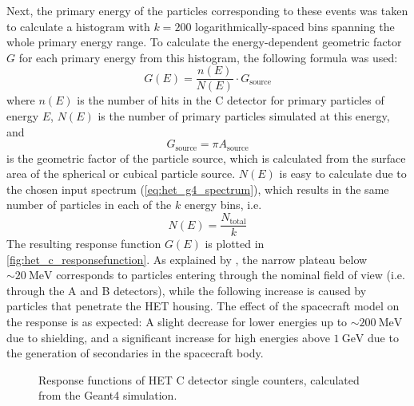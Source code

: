 Next, the primary energy of the particles corresponding to these events was taken to calculate a histogram with $k=200$ logarithmically-spaced bins spanning the whole primary energy range. To calculate the energy-dependent geometric factor $G$ for each primary energy from this histogram, the following formula \citep[based on][equation 18]{Sullivan-1971} was used:
\begin{equation}
G(E) = \frac{n(E)}{N(E)} \cdot G_\text{source}
\end{equation}
where $n(E)$ is the number of hits in the C detector for primary particles of energy $E$, $N(E)$ is the number of primary particles simulated at this energy, and
\begin{equation}
G_\text{source} = \pi A_\text{source}
\end{equation}
\citep[equation 6]{Sullivan-1971} is the geometric factor of the particle source, which is calculated from the surface area of the spherical or cubical particle source. $N(E)$ is easy to calculate due to the chosen input spectrum (\autoref{eq:het_g4_spectrum}), which results in the same number of particles in each of the $k$ energy bins, i.e.
\begin{equation}
N(E) = \frac{N_\text{total}}{k}
\end{equation}
The resulting response function $G(E)$ is plotted in \autoref{fig:het_c_responsefunction}. As explained by \citet[Section 2.1]{Forstner-2021-SolO}, the narrow plateau below $\sim\SI{20}{\mega\electronvolt}$ corresponds to particles entering through the nominal field of view (i.e. through the A and B detectors), while the following increase is caused by particles that penetrate the HET housing. The effect of the spacecraft model on the response is as expected: A slight decrease for lower energies up to $\sim\SI{200}{\mega\electronvolt}$ due to shielding, and a significant increase for high energies above $\SI{1}{\giga\electronvolt}$ due to the generation of secondaries in the spacecraft body.

\begin{figure}
	\centering
	
	\caption[Response functions of HET C detector single counters]{Response functions of HET C detector single counters, calculated from the Geant4 simulation.}
	\label{fig:het_c_responsefunction}
\end{figure}

